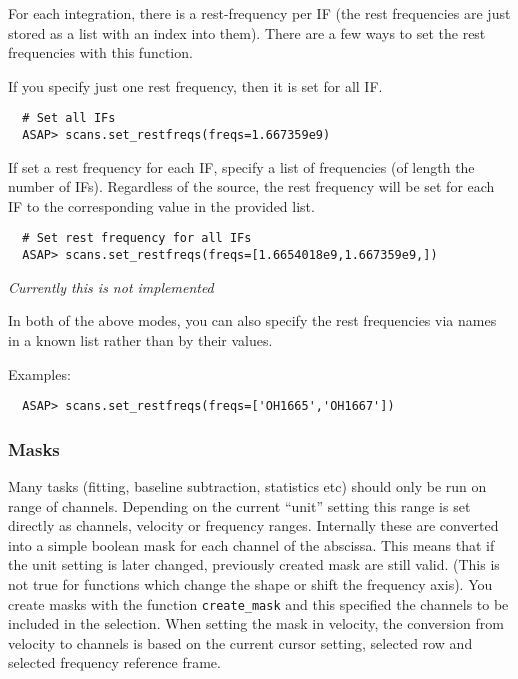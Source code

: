 \documentclass[11pt]{article}
\newcommand{\cmd}[1]{{\tt #1}}
\begin{document}
For each integration, there is a rest-frequency per IF (the rest
frequencies are just stored as a list with an index into them).
There are a few ways to set the rest frequencies with this function.

If you specify just one rest frequency, then it is set for all IF.

\begin{verbatim}
  # Set all IFs
  ASAP> scans.set_restfreqs(freqs=1.667359e9)
\end{verbatim}

If set a rest frequency for each IF, specify a list of frequencies (of
length the number of IFs).  Regardless of the source, the rest
frequency will be set for each IF to the corresponding value in the
provided list.

\begin{verbatim}
  # Set rest frequency for all IFs
  ASAP> scans.set_restfreqs(freqs=[1.6654018e9,1.667359e9,])

\end{verbatim}

{\em Currently this is not implemented}

In both of the above modes, you can also specify the rest frequencies via
names in a known list rather than by their values.

Examples:

\begin{verbatim}
  ASAP> scans.set_restfreqs(freqs=['OH1665','OH1667'])
\end{verbatim}


\subsubsection{Masks}


Many tasks (fitting, baseline subtraction, statistics etc) should only
be run on range of channels. Depending on the current ``unit'' setting
this range is set directly as channels, velocity or frequency
ranges. Internally these are converted into a simple boolean mask for
each channel of the abscissa. This means that if the unit setting is
later changed, previously created mask are still valid. (This is not
true for functions which change the shape or shift the frequency
axis).  You create masks with the function \cmd{create\_mask} and this
specified the channels to be included in the selection. When setting
the mask in velocity, the conversion from velocity to channels is
based on the current cursor setting, selected row and selected
frequency reference frame.
\end{document}
